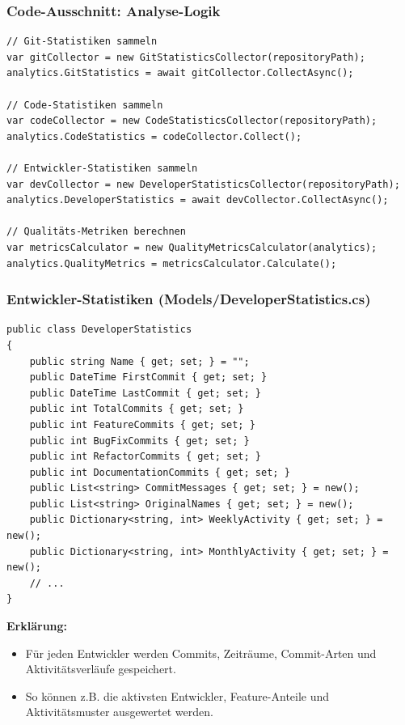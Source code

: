 \documentclass{beamer}
\begin{document}
\begin{frame}[fragile]
\frametitle{Code-Ausschnitt: Analyse-Logik}
\begin{lstlisting}[language=CSharp, basicstyle=\ttfamily\tiny, breaklines=true]
// Git-Statistiken sammeln
var gitCollector = new GitStatisticsCollector(repositoryPath);
analytics.GitStatistics = await gitCollector.CollectAsync();

// Code-Statistiken sammeln
var codeCollector = new CodeStatisticsCollector(repositoryPath);
analytics.CodeStatistics = codeCollector.Collect();

// Entwickler-Statistiken sammeln
var devCollector = new DeveloperStatisticsCollector(repositoryPath);
analytics.DeveloperStatistics = await devCollector.CollectAsync();

// Qualitäts-Metriken berechnen
var metricsCalculator = new QualityMetricsCalculator(analytics);
analytics.QualityMetrics = metricsCalculator.Calculate();
\end{lstlisting}
\end{frame}

\begin{frame}[fragile]
\frametitle{Entwickler-Statistiken (Models/DeveloperStatistics.cs)}
\begin{lstlisting}[language=CSharp, basicstyle=\ttfamily\tiny, breaklines=true]
public class DeveloperStatistics
{
    public string Name { get; set; } = "";
    public DateTime FirstCommit { get; set; }
    public DateTime LastCommit { get; set; }
    public int TotalCommits { get; set; }
    public int FeatureCommits { get; set; }
    public int BugFixCommits { get; set; }
    public int RefactorCommits { get; set; }
    public int DocumentationCommits { get; set; }
    public List<string> CommitMessages { get; set; } = new();
    public List<string> OriginalNames { get; set; } = new();
    public Dictionary<string, int> WeeklyActivity { get; set; } = new();
    public Dictionary<string, int> MonthlyActivity { get; set; } = new();
    // ...
}
\end{lstlisting}

\textbf{Erklärung:}
\begin{itemize}
  \item Für jeden Entwickler werden Commits, Zeiträume, Commit-Arten und Aktivitätsverläufe gespeichert.
  \item So können z.B. die aktivsten Entwickler, Feature-Anteile und Aktivitätsmuster ausgewertet werden.
\end{itemize}
\end{frame}
\end{document}
